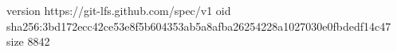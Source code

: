 version https://git-lfs.github.com/spec/v1
oid sha256:3bd172ecc42ce53e8f5b604353ab5a8afba26254228a1027030e0fbdedf14c47
size 8842
